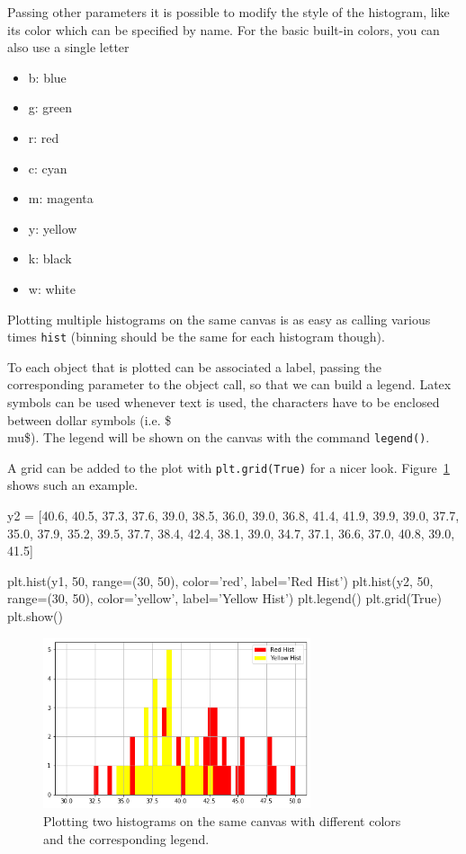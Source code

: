 Passing other parameters it is possible to modify the style of the
histogram, like its color which can be specified by name. For the basic built-in colors, you can also use a single letter

\begin{itemize}
\tightlist
\item b: blue
\item g: green
\item r: red
\item c: cyan
\item m: magenta
\item y: yellow
\item k: black
\item w: white
\end{itemize}

Plotting multiple histograms on the same canvas is as easy as calling various times \texttt{hist} (binning should be the same for each histogram though).

To each object that is plotted can be associated a label, passing the corresponding parameter to the object call, so that we can build a legend. Latex symbols can be used whenever text is used, the characters have to be enclosed between dollar symbols (i.e. \$\\mu\$). 
The legend will be shown on the canvas with the command  \texttt{legend()}.

A grid can be added to the plot with \texttt{plt.grid(True)} for a nicer look. Figure~\ref{fig:histo3} shows such an example.

\begin{ipythonnon}
y2 = [40.6, 40.5, 37.3, 37.6, 39.0, 38.5, 36.0, 
      39.0, 36.8, 41.4, 41.9, 39.9, 39.0, 37.7, 
      35.0, 37.9, 35.2, 39.5, 37.7, 38.4, 42.4, 
      38.1, 39.0, 34.7, 37.1, 36.6, 37.0, 40.8, 
      39.0, 41.5]

plt.hist(y1, 50, range=(30, 50), color='red', label='Red Hist')
plt.hist(y2, 50, range=(30, 50), color='yellow', label='Yellow Hist')
plt.legend()
plt.grid(True)
plt.show()
\end{ipythonnon}

\begin{figure}[htb]
	\centering
	\includegraphics[width=0.7\textwidth]{figures/histo3}
	\caption{Plotting two histograms on the same canvas with different colors and the 
		corresponding legend.}
	\label{fig:histo3}
\end{figure}

